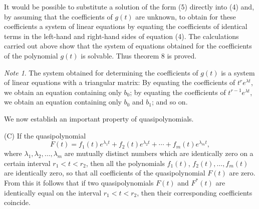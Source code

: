 \documentclass[10pt,a5paper]{book}
\makeatletter
\theoremstyle{plain}
\theoremstyle{definition}
\theoremstyle{remark}
\newtheorem*{note}{Note}
\renewenvironment{proof}[1][\proofname]{\par
  \pushQED{\qed}%
  \normalfont\topsep6\p@\@plus6\p@\relax
  \trivlist
  \item\relax{\itshape #1\@addpunct{.}}\hspace\labelsep\ignorespaces
}{\popQED\endtrivlist\@endpefalse}
\makeatother
\begin{document}
\begin{proof}
It would be possible to substitute a solution of the form (5) directly into (4) and, by assuming that the coefficients of $g(t)$ are unknown, to obtain for these coefficients a system of linear equations by equating the
coefficients of identical terms in the left-hand and right-hand sides of equation (4). The calculations carried out above show that the system of equations obtained for the coefficients of the polynomial $g(t)$ is solvable. Thus theorem 8 is proved.
\end{proof}

\begin{note}
The system obtained for determining the coefficients of $g(t)$ is a system of linear equations with a triangular matrix: By equating the coefficients of $t^{r} e^{\lambda t}$, we obtain an equation containing only $b_{0}$; by equating the coefficients of $t^{r-1} e^{\lambda t}$, we obtain an equation containing only $b_{0}$ and $b_{1}$; and so on.
\end{note}

We now establish an important property of quasipolynomials.

(C) If the quasipolynomial
\[
F(t)=f_{1}(t) e^{\lambda_{1} t}+f_{2}(t) e^{\lambda_{2} t}+\cdots+f_{m}(t) e^{\lambda_{m} t},
\]
where $\lambda_{1}, \lambda_{2}, \ldots, \lambda_{m}$ are mutually distinct numbers which are identically zero on a certain interval $r_{1}<t<r_{2}$, then all the polynomials $f_{1}(t)$, $f_{2}(t), \ldots, f_{m}(t)$ are identically zero, so that all coefficients of the quasipolynomial $F(t)$ are zero. From this it follows that if two quasipolynomials $F(t)$ and $F^{*}(t)$ are identically equal on the interval $r_{1}<t<r_{2}$, then their corresponding coefficients coincide.
\end{document}
